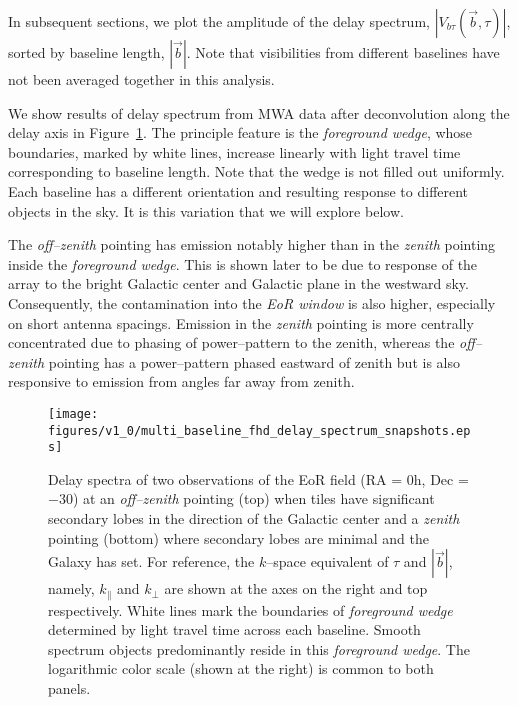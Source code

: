 \documentclass[preprint2,iop,numberedappendix]{emulateapj}
\begin{document}
In subsequent sections, we plot the amplitude of the delay spectrum, $|V_{b\tau}(\vec{b},\tau)|$, sorted by baseline length, $|\vec{b}|$. Note that visibilities from different baselines have not been averaged together in this analysis. 

We show results of delay spectrum from MWA data after deconvolution along the delay axis in Figure~\ref{fig:fhd_data}. The principle feature is the {\it foreground wedge}, whose boundaries, marked by white lines, increase linearly with light travel time corresponding to baseline length. Note that the wedge is not filled out uniformly. Each baseline has a different orientation and resulting response to different objects in the sky. It is this variation that we will explore below. 

The {\it off--zenith} pointing has emission notably higher than in the {\it zenith} pointing inside the {\it foreground wedge}. This is shown later to be due to response of the array to the bright Galactic center and Galactic plane in the westward sky. Consequently, the contamination into the {\it EoR window} is also higher, especially on short antenna spacings. Emission in the {\it zenith} pointing is more centrally concentrated due to phasing of power--pattern to the zenith, whereas the {\it off--zenith} pointing has a power--pattern phased eastward of zenith but is also responsive to emission from angles far away from zenith. 

\begin{figure}[htb]
\centering
\texttt{[image: figures/v1\_0/multi\_baseline\_fhd\_delay\_spectrum\_snapshots.eps]}
\caption{Delay spectra of two observations of the EoR field (RA = 0h, Dec = $-30$\arcdeg) at an {\it off--zenith} pointing (top) when tiles have significant secondary lobes in the direction of the Galactic center and a {\it zenith} pointing (bottom) where secondary lobes are minimal and the Galaxy has set. For reference, the $k$--space equivalent of $\tau$ and $|\vec{b}|$, namely, $k_\parallel$ and $k_\perp$ are shown at the axes on the right and top respectively. White lines mark the boundaries of {\it foreground wedge} determined by light travel time across each baseline. Smooth spectrum objects predominantly reside in this {\it foreground wedge}. The logarithmic color scale (shown at the right) is common to both panels. \label{fig:fhd_data}}
\end{figure}

\end{document}
